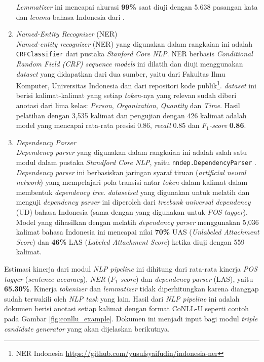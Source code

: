 \begin{enumerate}
\textit{Lemmatizer} ini mencapai akurasi \textbf{99\%} saat diuji dengan 5.638 pasangan kata dan \textit{lemma} bahasa Indonesia dari \cite{suhartono2014lemmatization}.

\item \textit{Named-Entity Recognizer} (NER) \\
\textit{Named-entity recognizer} (NER) yang digunakan dalam rangkaian ini adalah \verb|CRFClassifier| \citep{finkel2005incorporating} dari pustaka \textit{Stanford Core NLP}. NER berbasis \textit{Conditional Random Field (CRF) sequence models} ini dilatih dan diuji menggunakan \textit{dataset} yang didapatkan dari dua sumber, yaitu dari Fakultas Ilmu Komputer, Universitas Indonesia dan dari repositori kode publik\footnote{NER Indonesia \url{https://github.com/yusufsyaifudin/indonesia-ner}}. \textit{dataset} ini berisi kalimat-kalimat yang setiap \textit{token}-nya yang relevan sudah diberi anotasi dari lima kelas: \textit{Person}, \textit{Organization}, \textit{Quantity} dan \textit{Time}. Hasil pelatihan dengan 3,535 kalimat dan pengujian dengan 426 kalimat adalah model yang mencapai rata-rata presisi 0.86, \textit{recall} 0.85 dan \textit{$F_1$-score} \textbf{0.86}.

\item \textit{Dependency Parser} \\
\textit{Dependency parser} yang digunakan dalam rangkaian ini adalah salah satu modul dalam pustaka \textit{Standford Core NLP}, yaitu \verb|nndep.DependencyParser| \citep{chen2014fast}. \textit{Dependency parser} ini berbasiskan jaringan syaraf tiruan (\textit{artificial neural network}) yang mempelajari pola transisi antar \textit{token} dalam kalimat dalam membentuk \textit{dependency tree}. \textit{\textit{dataset}set} yang digunakan untuk melatih dan menguji \textit{dependency parser} ini diperoleh dari \textit{treebank} \textit{universal dependency} (UD) bahasa Indonesia (sama dengan yang digunakan untuk \textit{POS tagger}). Model yang dihasilkan dengan melatih \textit{dependency parser} menggunakan 5,036 kalimat bahasa Indonesia ini mencapai nilai \textbf{70\%} UAS (\textit{Unlabeled Attachment Score}) dan \textbf{46\%} LAS (\textit{Labeled Attachment Score}) ketika diuji dengan 559 kalimat.

\end{enumerate}

Estimasi kinerja dari modul \textit{NLP pipeline} ini dihitung dari rata-rata kinerja \textit{POS tagger} (\textit{sentence accuracy}), \textit{NER} (\textit{$F_1$-score}) dan \textit{dependency parser} (LAS), yaitu \textbf{65.30\%}. Kinerja \textit{tokenizer} dan \textit{lemmatizer} tidak diperhitungkan karena dianggap sudah terwakili oleh \textit{NLP task} yang lain. Hasil dari \textit{NLP pipeline} ini adalah dokumen berisi anotasi setiap kalimat dengan format CoNLL-U seperti contoh pada Gambar \ref{fig:conllu_example}. Dokumen ini menjadi input bagi modul \textit{triple candidate generator} yang akan dijelaskan berikutnya. 

